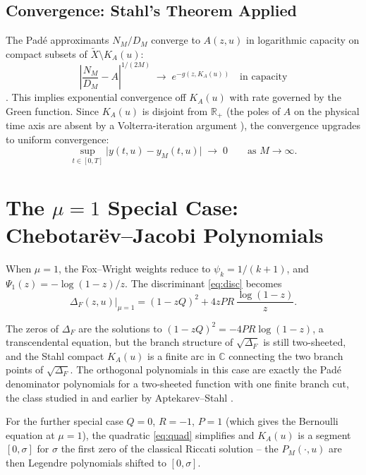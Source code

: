 \documentclass{article}
\newcommand{\C}{\mathbb{C}}
\newcommand{\R}{\mathbb{R}}
\begin{document}
\subsection{Convergence: Stahl's Theorem Applied}

The Padé approximants $N_M/D_M$ converge to $A(z,u)$ in logarithmic
capacity on compact subsets of $\widetilde{X}\setminus K_A(u)$:
\begin{equation}\label{eq:stahl_conv}
  \left|\frac{N_M}{D_M} - A\right|^{1/(2M)} \;\longrightarrow\;
  e^{-g(z,K_A(u))} \quad \text{in capacity}
\end{equation}
\cite{Stahl1997,Crowley2026}. This implies exponential convergence off
$K_A(u)$ with rate governed by the Green function. Since $K_A(u)$ is
disjoint from $\R_+$ (the poles of $A$ on the physical time axis are
absent by a Volterra-iteration argument \cite{Crowley2026}), the convergence
upgrades to uniform convergence:
\begin{equation}\label{eq:uniform_conv}
  \sup_{t\in[0,T]}\bigl|y(t,u) - y_M(t,u)\bigr| \;\longrightarrow\; 0
  \qquad \text{as } M\to\infty.
\end{equation}

\section{The $\mu = 1$ Special Case: Chebotarëv--Jacobi Polynomials}

When $\mu = 1$, the Fox--Wright weights reduce to $\psi_k = 1/(k+1)$, and
$\Psi_1(z) = -\log(1-z)/z$. The discriminant \eqref{eq:disc} becomes
\begin{equation}\label{eq:disc_mu1}
  \Delta_F(z,u)\big|_{\mu=1} = (1-zQ)^2 + 4zPR\,\frac{\log(1-z)}{z}.
\end{equation}

The zeros of $\Delta_F$ are the solutions to $(1-zQ)^2 = -4PR\log(1-z)$,
a transcendental equation, but the branch structure of $\sqrt{\Delta_F}$ is
still two-sheeted, and the Stahl compact $K_A(u)$ is a finite arc in
$\C$ connecting the two branch points of $\sqrt{\Delta_F}$. The orthogonal
polynomials in this case are exactly the Padé denominator polynomials for a
two-sheeted function with one finite branch cut, the class studied in
\cite{BarhoumiYattselev2023} and earlier by Aptekarev--Stahl
\cite{Stahl1997}.

For the further special case $Q = 0$, $R = -1$, $P = 1$ (which gives the
Bernoulli equation at $\mu=1$), the quadratic \eqref{eq:quad} simplifies
and $K_A(u)$ is a segment $[0, \sigma]$ for $\sigma$ the first zero of the
classical Riccati solution -- the $P_M(\cdot,u)$ are then Legendre polynomials
shifted to $[0, \sigma]$.
\end{document}
